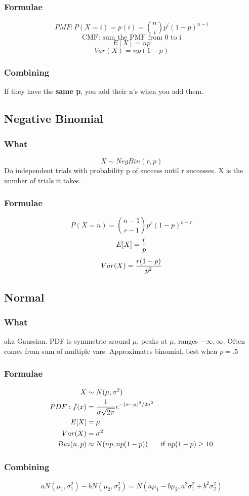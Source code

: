 \documentclass[12pt]{amsart}
\begin{document}
\subsubsection{Formulae}
\[
PMF: P(X = i) = p(i) = {n \choose i} p^i (1-p)^{n-i}
\]
\[
\text{CMF: sum the PMF from 0 to i}
\]
\[
E[X] = np
\]
\[
Var(X) = np(1-p)
\]
\subsubsection{Combining}
If they have the \textbf{same p}, you add their n's when you add them.
%
\subsection{Negative Binomial}
\subsubsection{What}
\[
X \sim NegBin(r, p)
\]
Do independent trials with probability p of success until r successes. X is the number of trials it takes.
\subsubsection{Formulae}
\[
P(X = n) = {n - 1 \choose r - 1} p^r (1-p)^{n-r}
\]
\[
E[X] = {r \over p}
\]
\[
Var(X) = {r(1-p) \over p^2}
\]
%
\subsection{Normal}
\subsubsection{What}
aka Gaussian. PDF is symmetric around $\mu$, peaks at $\mu$, ranges $-\infty, \infty$. Often comes from sum of multiple vars. Approximates binomial, best when $p = .5$
\subsubsection{Formulae}
\begin{align*}
X &\sim N(\mu, \sigma^2) \\
PDF: f(x) &= {1 \over \sigma \sqrt{2\pi}} e^{-(x-\mu)^2 / 2 \sigma^2} \\
E[X] &= \mu \\
Var(X) &= \sigma^2 \\
Bin(n, p) &\approx N(np, np(1-p)) & \text{if } np(1-p) \geq 10
\end{align*}
\subsubsection{Combining}
\[
aN(\mu_1, \sigma_1^2) - bN(\mu_2, \sigma_2^2) = N(a\mu_1 - b\mu_2, a^2 \sigma_1^2 + b^2 \sigma_2^2)
\]
\end{document}
